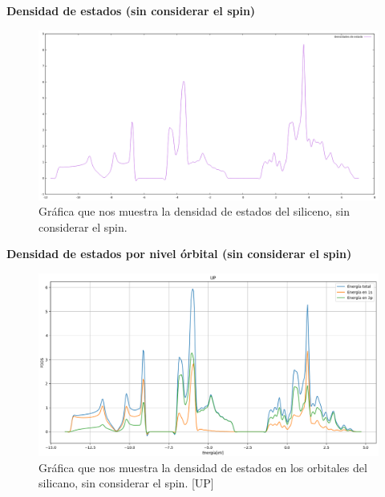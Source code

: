 \begin{frame}
    \textbf{Densidad de estados (sin considerar el spin)}
    \begin{figure}[H]
        \centering
        \includegraphics[scale=0.25]{images_silicano/Densidades_estado_sin_spin.png}
        \caption{Gráfica que nos muestra la densidad de estados del siliceno, sin considerar el spin.}
    \end{figure}
\end{frame}


\begin{frame}
    \textbf{Densidad de estados por nivel órbital (sin considerar el spin)}
    \begin{figure}[H]
        \centering
        \includegraphics[scale=0.25]{images_silicano/Densidad_estados_sin_spin_up.png}
        \caption{Gráfica que nos muestra la densidad de estados en los orbitales del silicano, sin considerar el spin. [UP]}
    \end{figure}
\end{frame}

